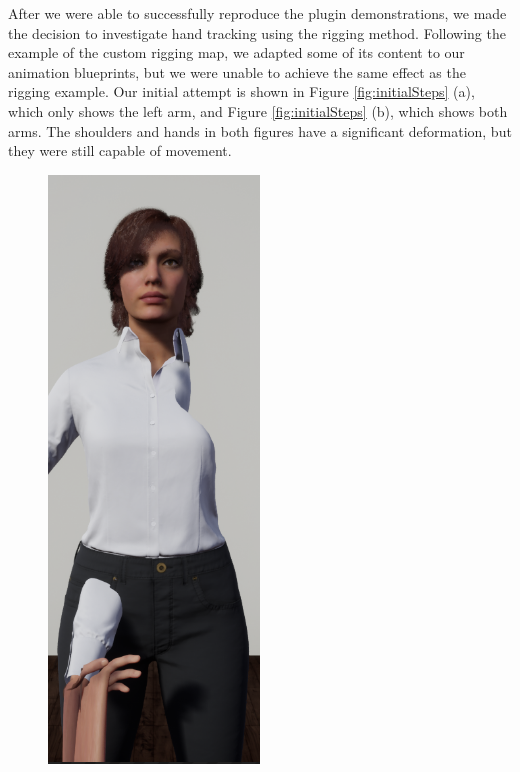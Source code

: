 After we were able to successfully reproduce the plugin demonstrations, we made the decision to investigate hand tracking using the rigging method. Following the example of the custom rigging map, we adapted some of its content to our animation blueprints, but we were unable to achieve the same effect as the rigging example. Our initial attempt is shown in Figure \ref{fig:initialSteps} (a), which only shows the left arm, and Figure \ref{fig:initialSteps} (b), which shows both arms. The shoulders and hands in both figures have a significant deformation, but they were still capable of movement.

\begin{table}[!htb]
    \begin{minipage}{\linewidth}
        \centering
        \begin{subfigure}{0.49\textwidth}
            \centering
            \includegraphics[width=0.5\textwidth]{figures/issue.png}

\end{subfigure}
\end{minipage}
\end{table}
